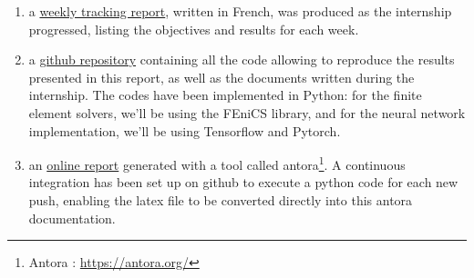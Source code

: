 \begin{enumerate}[label=\textbullet]
	\item a \href{https://github.com/flecourtier/phifem_stage/blob/main/docs/suivi/suivi.pdf}{weekly tracking report}, written in French, was produced as the internship progressed, listing the objectives and results for each week.
	\item a \href{https://github.com/flecourtier/phifem_stage}{github repository} containing all the code allowing to reproduce the results presented in this report, as well as the documents written during the internship. The codes have been implemented in Python: for the finite element solvers, we'll be using the FEniCS library, and for the neural network implementation, we'll be using Tensorflow and Pytorch.
	\item an \href{https://flecourtier.github.io/phifem_stage/phifem_project/1.0.3/main_page.html}{online report} generated with a tool called antora\footnote{Antora : \url{https://antora.org/}}. A continuous integration has been set up on github to execute a python code for each new push, enabling the latex file to be converted directly into this antora documentation.
\end{enumerate}